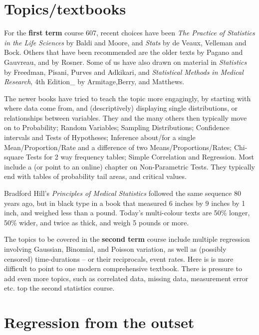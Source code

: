 \documentclass[]{book}
\begin{document}
\hypertarget{topicstextbooks-1}{%
\section{Topics/textbooks}\label{topicstextbooks-1}}

For the \textbf{first term} course 607, recent choices have been \emph{The Practice of Statistics in the Life Sciences} by Baldi and Moore, and \emph{Stats} by de Veaux, Velleman and Bock. Others that have been recommended are the older texts by Pagano and Gauvreau, and by Rosner. Some of us have also drawn on material in \emph{Statistics} by Freedman, Pisani, Purves and Adkikari, and
\emph{Statistical Methods in Medical Research}, 4th Edition\_ by
Armitage,Berry, and Matthews.

The newer books have tried to teach the topic more engagingly, by starting with where data come from, and (descriptively) displaying single distributions, or relationships between variables. They and the many others then typically move on to Probability; Random Variables; Sampling Distributions; Confidence intervals and Tests of Hypotheses; Inference about/for a single Mean/Proportion/Rate and a difference of two Means/Proportions/Rates; Chi-square Tests for 2 way frequency tables; Simple Correlation and Regression. Most include a (or point to an online) chapter on Non-Parametric Tests. They typically end with tables of probability tail areas, and critical values.

Bradford Hill's \emph{Principles of Medical Statistics} followed the same sequence 80 years ago, but in black type in a book that measured 6 inches by 9 inches by 1 inch, and weighed less than a pound. Today's multi-colour texts are 50\% longer, 50\% wider, and twice as thick, and weigh 5 pounds or more.

The topics to be covered in the \textbf{second term} course include multiple regression involving
Gaussian, Binomial, and Poisson variation, as well
as (possibly censored) time-durations -- or their reciprocals, event rates. Here is is more difficult to point to one modern comprehensive textbook.
There is pressure to add even more topics, such as correlated data, missing data, measurement error etc. top the second statistics course.

\hypertarget{regression-from-the-outset-1}{%
\section{Regression from the outset}\label{regression-from-the-outset-1}}
\end{document}
